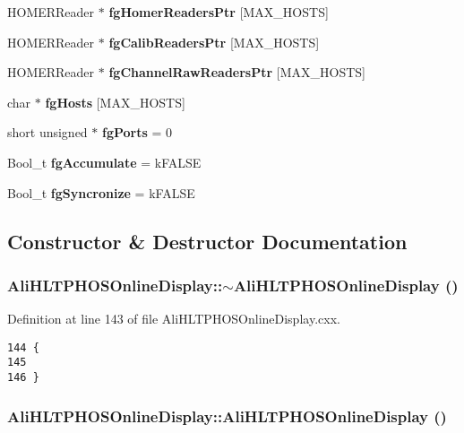 \begin{CompactItemize}
\item 
HOMERReader $\ast$ {\bf fg\-Homer\-Readers\-Ptr} [MAX\_\-HOSTS]
\item 
HOMERReader $\ast$ {\bf fg\-Calib\-Readers\-Ptr} [MAX\_\-HOSTS]
\item 
HOMERReader $\ast$ {\bf fg\-Channel\-Raw\-Readers\-Ptr} [MAX\_\-HOSTS]
\item 
char $\ast$ {\bf fg\-Hosts} [MAX\_\-HOSTS]
\item 
short unsigned $\ast$ {\bf fg\-Ports} = 0
\item 
Bool\_\-t {\bf fg\-Accumulate} = k\-FALSE
\item 
Bool\_\-t {\bf fg\-Syncronize} = k\-FALSE
\end{CompactItemize}


\subsection{Constructor \& Destructor Documentation}
\subsubsection{\setlength{\rightskip}{0pt plus 5cm}Ali\-HLTPHOSOnline\-Display::$\sim${\bf Ali\-HLTPHOSOnline\-Display} ()}\label{classAliHLTPHOSOnlineDisplay_a0}




Definition at line 143 of file Ali\-HLTPHOSOnline\-Display.cxx.

\footnotesize\begin{verbatim}144 {
145 
146 }
\end{verbatim}\normalsize 


\subsubsection{\setlength{\rightskip}{0pt plus 5cm}Ali\-HLTPHOSOnline\-Display::Ali\-HLTPHOSOnline\-Display ()\hspace{0.3cm}{\tt  [private]}}\label{classAliHLTPHOSOnlineDisplay_d0}




